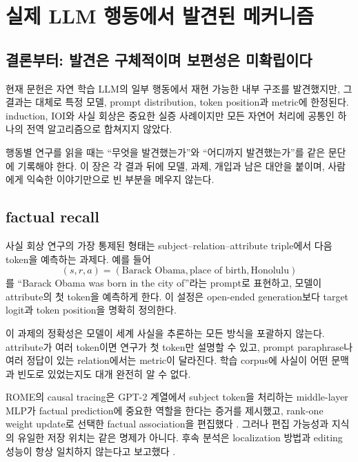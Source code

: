 \chapter{실제 LLM 행동에서 발견된 메커니즘}
\label{chap:phase7}

\section{결론부터: 발견은 구체적이며 보편성은 미확립이다}

현재 문헌은 자연 학습 LLM의 일부 행동에서 재현 가능한 내부 구조를 발견했지만, 그 결과는 대체로 특정 모델, prompt distribution, token position과 metric에 한정된다.
induction, IOI와 사실 회상은 중요한 실증 사례이지만 모든 자연어 처리에 공통인 하나의 전역 알고리즘으로 합쳐지지 않았다.

행동별 연구를 읽을 때는 ``무엇을 발견했는가''와 ``어디까지 발견했는가''를 같은 문단에 기록해야 한다.
이 장은 각 결과 뒤에 모델, 과제, 개입과 남은 대안을 붙이며, 사람에게 익숙한 이야기만으로 빈 부분을 메우지 않는다.

\section{factual recall}

사실 회상 연구의 가장 통제된 형태는 subject--relation--attribute triple에서 다음 token을 예측하는 과제다.
예를 들어
\begin{equation}
  (s,r,a)=(\text{Barack Obama},\text{place of birth},\text{Honolulu})
\end{equation}
를 ``Barack Obama was born in the city of''라는 prompt로 표현하고, 모델이 attribute의 첫 token을 예측하게 한다.
이 설정은 open-ended generation보다 target logit과 token position을 명확히 정의한다.

이 과제의 정확성은 모델이 세계 사실을 추론하는 모든 방식을 포괄하지 않는다.
attribute가 여러 token이면 연구가 첫 token만 설명할 수 있고, prompt paraphrase나 여러 정답이 있는 relation에서는 metric이 달라진다.
학습 corpus에 사실이 어떤 문맥과 빈도로 있었는지도 대개 완전히 알 수 없다.

ROME의 causal tracing은 GPT-2 계열에서 subject token을 처리하는 middle-layer MLP가 factual prediction에 중요한 역할을 한다는 증거를 제시했고, rank-one weight update로 선택한 factual association을 편집했다 \citep{meng2022rome}.
그러나 편집 가능성과 지식의 유일한 저장 위치는 같은 명제가 아니다.
후속 분석은 localization 방법과 editing 성능이 항상 일치하지 않는다고 보고했다 \citep{hase2023localization}.

